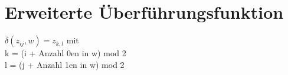 \documentclass{article}
\begin{document}
\section{Erweiterte Überführungsfunktion}
$\bar{\delta}(z_{ij}, w) = z_{k,l}$ mit \\
k = (i + Anzahl 0en in w) mod 2 \\
l = (j + Anzahl 1en in w) mod 2
\end{document}
